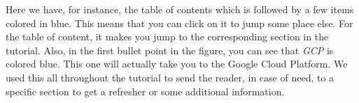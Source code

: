 
Here we have, for instance, the table of contents which is followed by
a few items colored in blue. This means that you can click on it to
jump some place else. For the table of content, it makes you jump to
the corresponding section in the tutorial. Also, in the first bullet
point in the figure, you can see that \textit{GCP} is colored blue.
This one will actually take you to the Google Cloud Platform.  We used
this all throughout the tutorial to send the reader, in case of need,
to a specific section to get a refresher or some additional
information.
